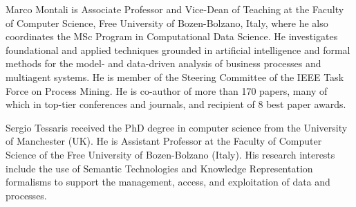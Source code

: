 \documentclass[10pt,journal,compsoc]{IEEEtran}
\theoremstyle{definition}
\theoremstyle{plain}
\begin{document}
\begin{IEEEbiography}{Marco Montali}
is Associate Professor and Vice-Dean of Teaching at the Faculty of Computer Science, Free University of Bozen-Bolzano, Italy, where he also coordinates the MSc Program in Computational Data Science. He investigates foundational and applied techniques grounded in artificial intelligence and formal methods for the model- and data-driven analysis of business processes and multiagent systems. He is member of the Steering Committee of the IEEE Task Force on Process Mining. He is co-author of more than 170 papers, many of which in top-tier conferences and journals, and recipient of 8 best paper awards.\end{IEEEbiography}


\begin{IEEEbiography}{Sergio Tessaris}
received the PhD degree in computer science from the University of Manchester (UK). He is Assistant Professor at the Faculty of Computer Science of the Free University of Bozen-Bolzano (Italy). His research interests include the use of Semantic Technologies and Knowledge Representation formalisms to support the management, access, and exploitation of data and processes.
\end{IEEEbiography}

\vfill
\end{document}
